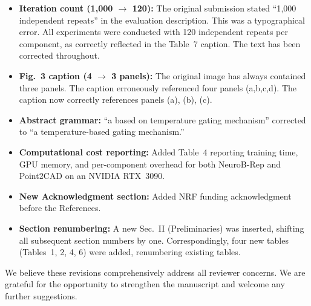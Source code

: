 \documentclass[11pt]{article}
\begin{document}
\begin{itemize}
  \item \textbf{Iteration count (1{,}000 $\rightarrow$ 120):}
        The original submission stated ``1{,}000 independent repeats''
        in the evaluation description. This was a typographical error.
        All experiments were conducted with 120 independent repeats
        per component, as correctly reflected in the Table~7 caption.
        The text has been corrected throughout.

  \item \textbf{Fig.~3 caption (4 $\rightarrow$ 3 panels):}
        The original image has always contained three panels.
        The caption erroneously referenced four panels (a,b,c,d).
        The caption now correctly references panels (a), (b), (c).

  \item \textbf{Abstract grammar:}
        ``a based on temperature gating mechanism'' corrected to
        ``a temperature-based gating mechanism.''

  \item \textbf{Computational cost reporting:}
        Added Table~4 reporting training time, GPU memory, and
        per-component overhead for both NeuroB-Rep and Point2CAD
        on an NVIDIA RTX~3090.

  \item \textbf{New Acknowledgment section:}
        Added NRF funding acknowledgment before the References.

  \item \textbf{Section renumbering:}
        A new Sec.~II (Preliminaries) was inserted, shifting all
        subsequent section numbers by one. Correspondingly, four
        new tables (Tables~1, 2, 4, 6) were added, renumbering
        existing tables.
\end{itemize}

\bigskip
\noindent We believe these revisions comprehensively address all
reviewer concerns. We are grateful for the opportunity to
strengthen the manuscript and welcome any further suggestions.
\end{document}
